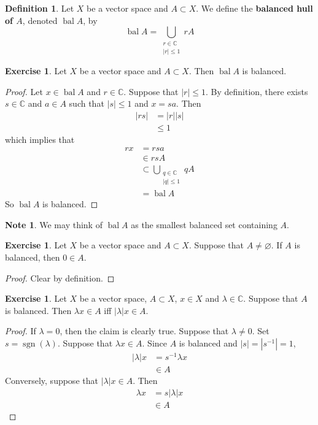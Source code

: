 \documentclass[12pt]{amsart}
\theoremstyle{definition}
\newtheorem{defn}[definition]{Definition}
\newtheorem{note}[definition]{Note}
\newtheorem{ex}[definition]{Exercise}
\newcommand{\lam}{\lambda}
\newcommand{\C}{\mathbb{C}}
\DeclareMathOperator{\sgn}{sgn}
\DeclareMathOperator{\bal}{bal}
\begin{document}
	\begin{defn}
		Let $X$ be a vector space and $A \subset X$. We define the \textbf{balanced hull of $A$}, denoted $\bal A$, by $$\bal A = \bigcup_{\substack{r \in \C \\ |r| \leq 1}} rA$$
	\end{defn}

	\begin{ex}
		Let $X$ be a vector space and $A \subset X$. Then $\bal A$ is balanced. 
	\end{ex}

	\begin{proof}
		Let $x \in \bal A$ and $r \in \C$. Suppose that $|r| \leq 1$. By definition, there exists $s \in \C$ and $a \in A$ such that $|s| \leq 1$ and $x = sa$. Then 
		\begin{align*}
			|rs| 
			&= |r||s| \\
			&\leq 1
		\end{align*}
		which implies that
		\begin{align*}
			rx 
			&= rsa \\
			& \in rsA \\
			& \subset \bigcup_{\substack{q \in \C \\ |q| \leq 1}} qA \\
			&= \bal A
		\end{align*}
		So $\bal A$ is balanced.
	\end{proof}
	
	\begin{note}
		We may think of $\bal A$ as the smallest balanced set containing $A$. 
	\end{note}
	
	\begin{ex}
		Let $X$ be a vector space and $A \subset X$. Suppose that $A \neq \varnothing$. If $A$ is balanced, then $0 \in A$.
	\end{ex}
	
	\begin{proof}
		Clear by definition.
	\end{proof}

	\begin{ex}
		Let $X$ be a vector space, $A \subset X$, $x \in X$ and $\lam \in \C$. Suppose that $A$ is balanced. Then $\lam x \in A$ iff $|\lam| x \in A$.  
	\end{ex}
	
	\begin{proof}
		If $\lam = 0$, then the claim is clearly true. Suppose that $\lam \neq 0$. Set $s = \sgn(\lam)$. Suppose that $\lam x \in A$. Since $A$ is balanced and $|s| = |s^{-1}| = 1$, 
		\begin{align*}
			|\lam|x 
			&= s^{-1} \lam x \\
			& \in A
		\end{align*}
		Conversely, suppose that $|\lam| x \in A$. Then 
		\begin{align*}
			\lam x 
			&= s |\lam| x \\
			& \in A
		\end{align*}
	\end{proof}
\end{document}
